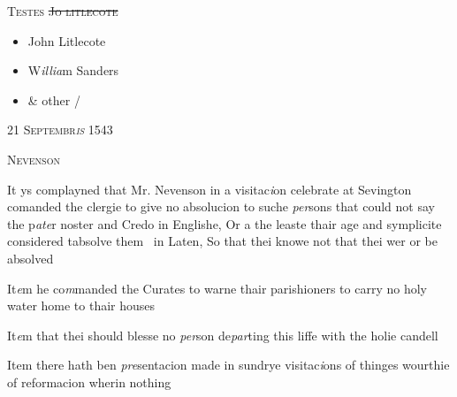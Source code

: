 \documentclass[12pt, a4paper]{book}
\begin{document}
 	\begin{center} {\scshape Testes \sout{Jo litlecote}} \end{center}\begin{itemize}
 		
 		\item[]John Litlecote
		 \item[]W\textit{illia}m Sanders
		 \item[]\& other /
 	\end{itemize}
 
 

            
               
				\begin{center} \begin{large} {\scshape 
                  21 Septembr\textit{is} 1543
               } \end{large} \end{center}
			
               
                  
				\begin{center}  {\scshape Nevenson}  \end{center}
			
               	
		\ifthenelse{\isodd{\thepage}}
		{\reversemarginpar}
		{\normalmarginpar}
		It ys complayned that Mr. Nevenson in a visitac\textit{i}on
 celebrate at Sevington comanded the clergie to give
 no absolucion to suche \textit{per}sons that could not say the
 p\textit{ate}r noster and Credo in Englishe, Or a the leaste
 thair age and symplicite considered tabsolve them 
 in Laten, So that thei knowe not that thei wer or
 be absolved
 
			 
		\ifthenelse{\isodd{\thepage}}
		{\reversemarginpar}
		{\normalmarginpar}
		It\textit{e}m he co\textit{m}manded the Curates to warne thair
 parishioners to carry no holy water home to thair
 houses
 
				\marginpar[\vspace{0.5cm}{\textcolor{Gray}{holy candle}}]{}
			
		\ifthenelse{\isodd{\thepage}}
		{\reversemarginpar}
		{\normalmarginpar}
		It\textit{e}m that thei should blesse no \textit{per}son de\textit{par}ting this liffe
 with the holie candell
 
		\ifthenelse{\isodd{\thepage}}
		{\reversemarginpar}
		{\normalmarginpar}
		Item there hath ben \textit{pre}sentacion made in sundrye visitac\textit{i}ons
 of thinges wourthie of reformacion wherin nothing
               	
\end{document}
